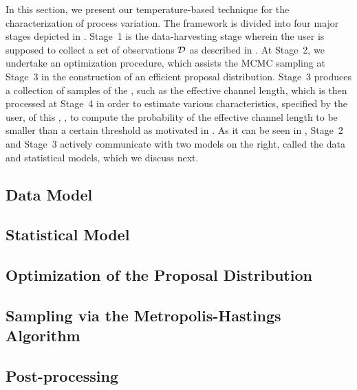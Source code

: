 
In this section, we present our temperature-based technique for the characterization of process variation. The framework is divided into four major stages depicted in .
Stage~1 is the data-harvesting stage wherein the user is supposed to collect a set of observations $\mathcal{D}$ as described in .
At Stage~2, we undertake an optimization procedure, which assists the MCMC sampling at Stage~3 in the construction of an efficient proposal distribution.
Stage~3 produces a collection of samples of the \qoi, such as the effective channel length, which is then processed at Stage~4 in order to estimate various characteristics, specified by the user, of this \qoi, \eg, to compute the probability of the effective channel length to be smaller than a certain threshold as motivated in .
As it can be seen in , Stage~2 and Stage~3 actively communicate with two models on the right, called the data and statistical models, which we discuss next.

\subsection{Data Model}   


\subsection{Statistical Model} 


\subsection{Optimization of the Proposal Distribution} 


\subsection{Sampling via the Metropolis-Hastings Algorithm} 


\subsection{Post-processing} 

